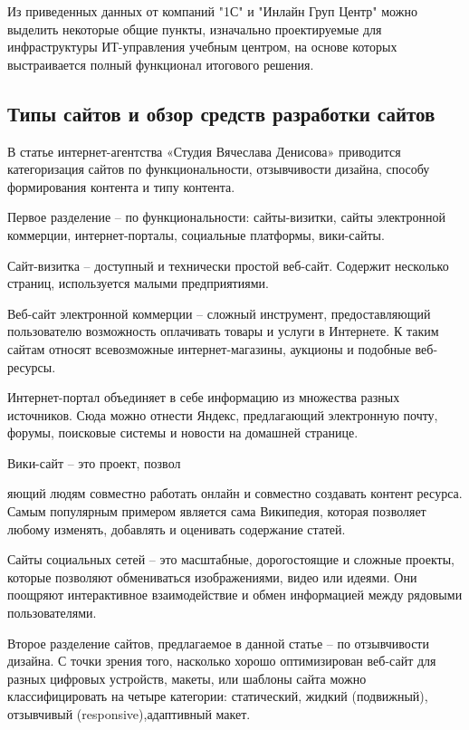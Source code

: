 Из приведенных данных от компаний "1С" и "Инлайн Груп Центр" можно выделить некоторые общие пункты, изначально проектируемые для инфраструктуры ИТ-управления учебным центром, на основе которых выстраивается полный функционал итогового решения.

\subsection{Типы сайтов и обзор средств разработки сайтов}

В статье интернет-агентства «Студия Вячеслава Денисова» \cite{denisov} приводится категоризация сайтов по функциональности, отзывчивости дизайна, способу формирования контента и типу контента.


Первое разделение -- по функциональности: сайты-визитки, сайты электронной коммерции, интернет-порталы, социальные платформы, вики-сайты.

Сайт-визитка -- доступный и технически простой веб-сайт.
Содержит несколько страниц, используется малыми предприятиями.

Веб-сайт электронной коммерции -- сложный инструмент, предоставляющий пользователю возможность оплачивать товары и услуги в Интернете.
К таким сайтам относят всевозможные интернет-магазины, аукционы и подобные веб-ресурсы.

Интернет-портал объединяет в себе информацию из множества разных источников.
Сюда можно отнести Яндекс, предлагающий электронную почту, форумы, поисковые системы и новости на домашней странице.

Вики-сайт -- это проект, позвол


яющий людям совместно работать онлайн и совместно создавать контент ресурса.
Самым популярным примером является сама Википедия, которая позволяет любому изменять, добавлять и оценивать содержание статей.

Сайты социальных сетей -- это масштабные, дорогостоящие и сложные проекты, которые позволяют обмениваться изображениями, видео или идеями.
Они поощряют интерактивное взаимодействие и обмен информацией между рядовыми пользователями.


Второе разделение сайтов, предлагаемое в данной статье -- по отзывчивости дизайна.
С точки зрения того, насколько хорошо оптимизирован веб-сайт для разных цифровых устройств, макеты, или шаблоны сайта можно классифицировать на четыре категории: статический, жидкий (подвижный), отзывчивый (responsive),адаптивный макет.

